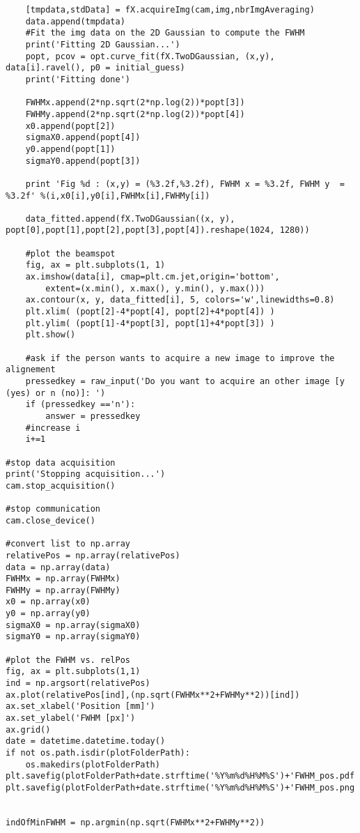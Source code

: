 \begin{lstlisting}
    [tmpdata,stdData] = fX.acquireImg(cam,img,nbrImgAveraging)
    data.append(tmpdata)
    #Fit the img data on the 2D Gaussian to compute the FWHM
    print('Fitting 2D Gaussian...')
    popt, pcov = opt.curve_fit(fX.TwoDGaussian, (x,y), data[i].ravel(), p0 = initial_guess)
    print('Fitting done')

    FWHMx.append(2*np.sqrt(2*np.log(2))*popt[3])
    FWHMy.append(2*np.sqrt(2*np.log(2))*popt[4])
    x0.append(popt[2])
    sigmaX0.append(popt[4])
    y0.append(popt[1])
    sigmaY0.append(popt[3])

    print 'Fig %d : (x,y) = (%3.2f,%3.2f), FWHM x = %3.2f, FWHM y  = %3.2f' %(i,x0[i],y0[i],FWHMx[i],FWHMy[i])

    data_fitted.append(fX.TwoDGaussian((x, y), popt[0],popt[1],popt[2],popt[3],popt[4]).reshape(1024, 1280))

    #plot the beamspot
    fig, ax = plt.subplots(1, 1)
    ax.imshow(data[i], cmap=plt.cm.jet,origin='bottom',
        extent=(x.min(), x.max(), y.min(), y.max()))
    ax.contour(x, y, data_fitted[i], 5, colors='w',linewidths=0.8)
    plt.xlim( (popt[2]-4*popt[4], popt[2]+4*popt[4]) )
    plt.ylim( (popt[1]-4*popt[3], popt[1]+4*popt[3]) )
    plt.show()

    #ask if the person wants to acquire a new image to improve the alignement
    pressedkey = raw_input('Do you want to acquire an other image [y (yes) or n (no)]: ')
    if (pressedkey =='n'):
        answer = pressedkey
    #increase i
    i+=1

#stop data acquisition
print('Stopping acquisition...')
cam.stop_acquisition()

#stop communication
cam.close_device()

#convert list to np.array
relativePos = np.array(relativePos)
data = np.array(data)
FWHMx = np.array(FWHMx)
FWHMy = np.array(FWHMy)
x0 = np.array(x0)
y0 = np.array(y0)
sigmaX0 = np.array(sigmaX0)
sigmaY0 = np.array(sigmaY0)

#plot the FWHM vs. relPos
fig, ax = plt.subplots(1,1)
ind = np.argsort(relativePos)
ax.plot(relativePos[ind],(np.sqrt(FWHMx**2+FWHMy**2))[ind])
ax.set_xlabel('Position [mm]')
ax.set_ylabel('FWHM [px]')
ax.grid()
date = datetime.datetime.today()
if not os.path.isdir(plotFolderPath):
    os.makedirs(plotFolderPath)
plt.savefig(plotFolderPath+date.strftime('%Y%m%d%H%M%S')+'FWHM_pos.pdf')
plt.savefig(plotFolderPath+date.strftime('%Y%m%d%H%M%S')+'FWHM_pos.png')


indOfMinFWHM = np.argmin(np.sqrt(FWHMx**2+FWHMy**2))


\end{lstlisting}
